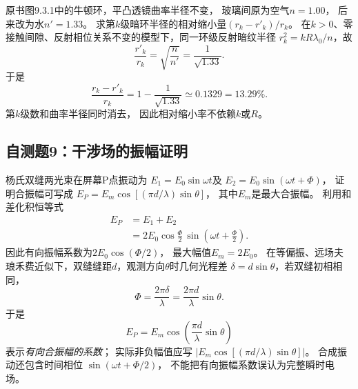 \problemtext 原书图9.3.1中的牛顿环，平凸透镜曲率半径不变，
玻璃间原为空气$n=1.00$，
后来改为水$n'=1.33$。
求第$k$级暗环半径的相对缩小量$(r_k-r'_k)/r_k$。
\workings
在$k>0$、零接触间隙、反射相位关系不变的模型下，同一环级反射暗纹半径
$r_k^2=kR\lambda_0/n$，故
\[
 \frac{r'_k}{r_k}=\sqrt{\frac{n}{n'}}
 =\frac1{\sqrt{1.33}}.
\]
于是
\[
\boxed{\frac{r_k-r'_k}{r_k}
=1-\frac1{\sqrt{1.33}}\simeq0.1329=13.29\%}.
\]
\crosscheck 第$k$级数和曲率半径同时消去，
因此相对缩小率不依赖$k$或$R$。

\subsection{自测题9：干涉场的振幅证明}

\problemtext 杨氏双缝两光束在屏幕P点振动为
$E_1=E_0\sin\omega t$及
$E_2=E_0\sin(\omega t+\Phi)$，
证明合振幅可写成
$E_P=E_m\cos[(\pi d/\lambda)\sin\theta]$，
其中$E_m$是最大合振幅。
\workings
利用和差化积恒等式
\[
\begin{aligned}
E_P&=E_1+E_2\\
&=2E_0\cos\frac\Phi2\,
 \sin\left(\omega t+\frac\Phi2\right).
\end{aligned}
\]
因此有向振幅系数为$2E_0\cos(\Phi/2)$，
最大幅值$E_m=2E_0$。
在等偏振、远场夫琅禾费近似下，双缝缝距$d$，观测方向$\theta$时几何光程差
$\delta=d\sin\theta$，若双缝初相相同，
\[
\Phi=\frac{2\pi\delta}{\lambda}
=\frac{2\pi d}{\lambda}\sin\theta.
\]
于是
\[
\boxed{E_P=E_m\cos\left(\frac{\pi d}{\lambda}\sin\theta\right)}
\]
表示\emph{有向合振幅的系数}；
实际非负幅值应写
$|E_m\cos[(\pi d/\lambda)\sin\theta]|$。
\crosscheck 合成振动还包含时间相位
$\sin(\omega t+\Phi/2)$，
不能把有向振幅系数误认为完整瞬时电场。
